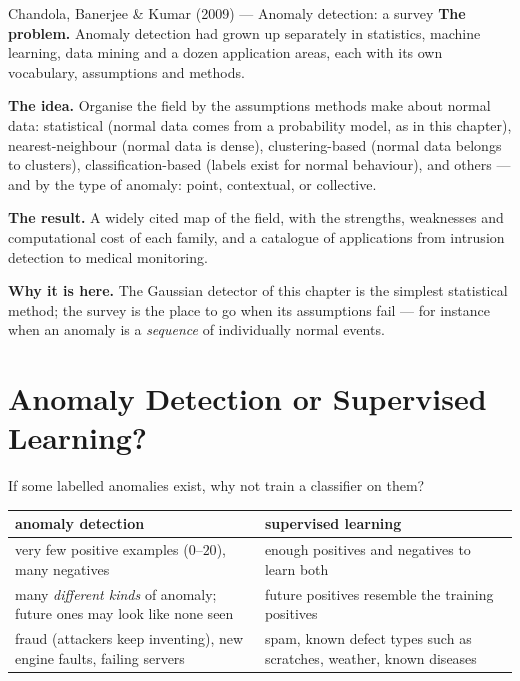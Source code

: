\begin{researchspotlight}{Chandola, Banerjee \& Kumar (2009) --- Anomaly detection: a survey}
\textbf{The problem.} Anomaly detection had grown up separately in statistics,
machine learning, data mining and a dozen application areas, each with its own
vocabulary, assumptions and methods.

\textbf{The idea.} Organise the field by the assumptions methods make about
normal data: statistical (normal data comes from a probability model, as in this
chapter), nearest-neighbour (normal data is dense), clustering-based (normal data
belongs to clusters), classification-based (labels exist for normal behaviour),
and others --- and by the type of anomaly: point, contextual, or collective.

\textbf{The result.} A widely cited map of the field, with the strengths,
weaknesses and computational cost of each family, and a catalogue of
applications from intrusion detection to medical monitoring.

\textbf{Why it is here.} The Gaussian detector of this chapter is the simplest
statistical method; the survey is the place to go when its assumptions fail ---
for instance when an anomaly is a \emph{sequence} of individually normal events.
\parencite{chandola2009}
\end{researchspotlight}

\section{Anomaly Detection or Supervised Learning?}
\label{sec:ad-vs-sl}

If some labelled anomalies exist, why not train a classifier on them?

\begin{center}
\small
\renewcommand{\arraystretch}{1.3}
\begin{tabular}{@{}L{5.3cm}L{5.3cm}@{}}
\toprule
\textbf{anomaly detection} & \textbf{supervised learning}\\
\midrule
very few positive examples ($0$--$20$), many negatives
  & enough positives and negatives to learn both\\
many \emph{different kinds} of anomaly; future ones may look like none seen
  & future positives resemble the training positives\\
fraud (attackers keep inventing), new engine faults, failing servers
  & spam, known defect types such as scratches, weather, known diseases\\
\bottomrule
\end{tabular}
\end{center}

